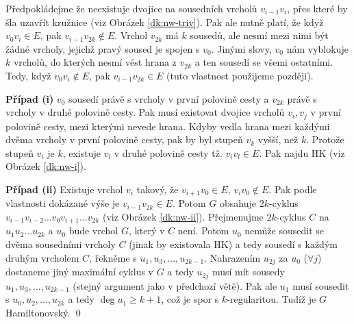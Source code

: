 Předpokládejme že neexistuje dvojice na sousedních vrcholů $v_{i-1}v_i$, přes které by šla uzavřít kružnice (viz Obrázek \ref{dk:nw-triv}). Pak ale nutně platí, že když $v_0v_i \in E$, pak $v_{i-1}v_{2k} \not\in E$. Vrchol $v_{2k}$ má $k$ sousedů, ale nesmí mezi nimi být žádné vrcholy, jejichž pravý soused je spojen s $v_0$. Jinými slovy, $v_0$ nám vyblokuje $k$ vrcholů, do kterých nesmí vést hrana z $v_{2k}$ a ten sousedí se všemi ostatními. Tedy, když $v_0v_i \not\in E$, pak $v_{i-1}v_{2k} \in E$ (tuto vlastnost použijeme později).

\textbf{Případ (i)} $v_0$ sousedí právě s vrcholy v první polovině cesty a $v_{2k}$ právě s vrcholy v druhé polovině cesty. Pak musí existovat dvojice vrcholů $v_i,v_j$ v první polovině cesty, mezi kterými nevede hrana. Kdyby vedla hrana mezi každými dvěma vrcholy v první polovině cesty, pak by byl stupeň $v_k$ vyšší, než $k$. Protože stupeň $v_i$ je $k$, existuje $v_l$ v druhé polovině cesty tž. $v_iv_l \in E$. Pak najdu HK (viz Obrázek \ref{dk:nw-i}).

\textbf{Případ (ii)} Existuje vrchol $v_i$ takový, že $v_{i+1}v_0 \in E$, $v_iv_0 \not\in E$. Pak podle vlastnosti dokázané výše je $v_{i-1}v_{2k} \in E$. Potom $G$ obsahuje $2k$-cyklus $v_{i-1}v_{i-2}\dots v_0v_{i+1}\dots v_{2k}$ (viz Obrázek \ref{dk:nw-ii}). Přejmenujme $2k$-cyklus $C$ na $u_1u_2\dots u_{2k}$ a $u_0$ bude vrchol $G$, který v $C$ není. Potom $u_0$ nemůže sousedit se dvěma sousedními vrcholy $C$ (jinak by existovala HK) a tedy sousedí s každým druhým vrcholem $C$, řekněme s $u_1, u_3, \dots, u_{2k-1}$. Nahrazením $u_{2j}$ za $u_0$ ($\forall j$) dostaneme jiný maximální cyklus v $G$ a tedy $u_{2j}$ musí mít sousedy $u_1, u_3, \dots, u_{2k-1}$ (stejný argument jako v předchozí větě). Pak ale $u_1$ musí sousedit s $u_0, u_2, \dots, u_{2k}$ a tedy $\deg u_1 \ge k+1$, což je spor s $k$-regularitou. Tudíž je $G$ Hamiltonovský.
\qed

